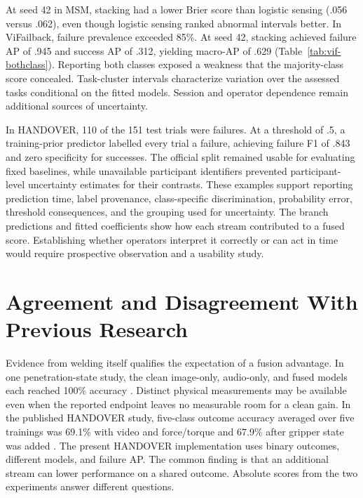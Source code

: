 At seed 42 in MSM, stacking had a lower Brier score than logistic sensing (.056 versus .062), even though logistic sensing ranked abnormal intervals better. In ViFailback, failure prevalence exceeded 85\%. At seed 42, stacking achieved failure AP of .945 and success AP of .312, yielding macro-AP of .629 (Table~\ref{tab:vif-bothclass}). Reporting both classes exposed a weakness that the majority-class score concealed. Task-cluster intervals characterize variation over the assessed tasks conditional on the fitted models. Session and operator dependence remain additional sources of uncertainty.

In HANDOVER, 110 of the 151 test trials were failures. At a threshold of .5, a training-prior predictor labelled every trial a failure, achieving failure F1 of .843 and zero specificity for successes. The official split remained usable for evaluating fixed baselines, while unavailable participant identifiers prevented participant-level uncertainty estimates for their contrasts. These examples support reporting prediction time, label provenance, class-specific discrimination, probability error, threshold consequences, and the grouping used for uncertainty. The branch predictions and fitted coefficients show how each stream contributed to a fused score. Establishing whether operators interpret it correctly or can act in time would require prospective observation and a usability study.

\section{Agreement and Disagreement With Previous Research}
Evidence from welding itself qualifies the expectation of a fusion advantage. In one penetration-state study, the clean image-only, audio-only, and fused models each reached 100\% accuracy \citep[Tables~1--3]{Hua2026Weld}. Distinct physical measurements may be available even when the reported endpoint leaves no measurable room for a clean gain. In the published HANDOVER study, five-class outcome accuracy averaged over five trainings was 69.1\% with video and force/torque and 67.9\% after gripper state was added \citep[Table~III]{Thoduka2024Handover}. The present HANDOVER implementation uses binary outcomes, different models, and failure AP. The common finding is that an additional stream can lower performance on a shared outcome. Absolute scores from the two experiments answer different questions.

